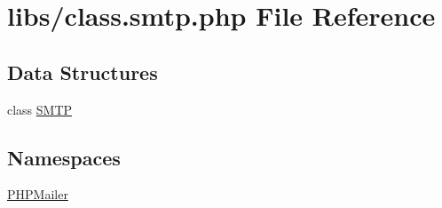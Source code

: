 \hypertarget{class_8smtp_8php}{}\section{libs/class.smtp.\+php File Reference}
\label{class_8smtp_8php}
\subsection*{Data Structures}
\begin{DoxyCompactItemize}
\item 
class \hyperlink{class_s_m_t_p}{S\+M\+T\+P}
\end{DoxyCompactItemize}
\subsection*{Namespaces}
\begin{DoxyCompactItemize}
\item 
 \hyperlink{namespace_p_h_p_mailer}{P\+H\+P\+Mailer}
\end{DoxyCompactItemize}
